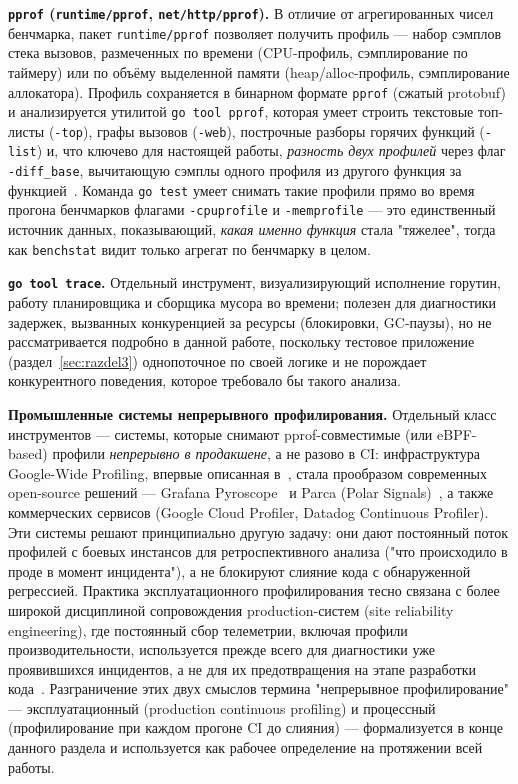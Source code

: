 \textbf{\texttt{pprof} (\texttt{runtime/\allowbreak pprof}, \texttt{net/\allowbreak http/\allowbreak pprof}).}
В отличие от агрегированных чисел бенчмарка, пакет \texttt{runtime/\allowbreak pprof}
позволяет получить профиль — набор сэмплов стека вызовов, размеченных по
времени (CPU-профиль, сэмплирование по таймеру) или по объёму выделенной
памяти (heap/alloc-профиль, сэмплирование аллокатора). Профиль сохраняется в
бинарном формате \texttt{pprof} (сжатый protobuf) и анализируется утилитой
\texttt{go tool pprof}, которая умеет строить текстовые топ-листы
(\texttt{-top}), графы вызовов (\texttt{-web}), построчные разборы горячих
функций (\texttt{-list}) и, что ключево для настоящей работы, \emph{разность
двух профилей} через флаг \texttt{-diff\_base}, вычитающую сэмплы одного
профиля из другого функция за функцией~\cite{go-pprof-doc,go-pprof-tool,pprof-github}.
Команда \texttt{go test} умеет снимать такие профили прямо во время прогона
бенчмарков флагами \texttt{-cpuprofile} и \texttt{-memprofile} — это
единственный источник данных, показывающий, \emph{какая именно функция}
стала "тяжелее", тогда как \texttt{benchstat} видит только агрегат по
бенчмарку в целом.

\textbf{\texttt{go tool trace}.} Отдельный инструмент, визуализирующий
исполнение горутин, работу планировщика и сборщика мусора во времени;
полезен для диагностики задержек, вызванных конкуренцией за ресурсы
(блокировки, GC-паузы), но не рассматривается подробно в данной работе,
поскольку тестовое приложение (раздел~\ref{sec:razdel3}) однопоточное по
своей логике и не порождает конкурентного поведения, которое требовало бы
такого анализа.

\textbf{Промышленные системы непрерывного профилирования.} Отдельный класс
инструментов — системы, которые снимают pprof-совместимые (или
eBPF-based) профили \emph{непрерывно в продакшене}, а не разово в CI:
инфраструктура Google-Wide Profiling, впервые описанная
в~\cite{ren2010}, стала прообразом современных open-source решений —
Grafana Pyroscope~\cite{pyroscope-doc} и Parca (Polar Signals)~\cite{parca-doc},
а также коммерческих сервисов (Google Cloud Profiler, Datadog Continuous
Profiler). Эти системы решают принципиально другую задачу: они дают
постоянный поток профилей с боевых инстансов для ретроспективного анализа
("что происходило в проде в момент инцидента"), а не блокируют слияние кода
с обнаруженной регрессией. Практика эксплуатационного профилирования тесно
связана с более широкой дисциплиной сопровождения production-систем
(site reliability engineering), где постоянный сбор телеметрии, включая
профили производительности, используется прежде всего для диагностики уже
проявившихся инцидентов, а не для их предотвращения на этапе разработки
кода~\cite{beyer-sre}. Разграничение этих двух смыслов термина
"непрерывное профилирование" — эксплуатационный (production continuous
profiling) и процессный (профилирование при каждом прогоне CI до слияния) —
формализуется в конце данного раздела и используется как рабочее определение
на протяжении всей работы.


